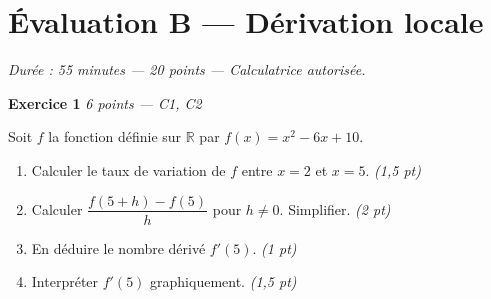 
\section*{Évaluation B — Dérivation locale}

\textit{Durée : 55 minutes — 20 points — Calculatrice autorisée.}

\bigskip

\textbf{Exercice 1} \hfill \textit{6 points — C1, C2}

Soit $f$ la fonction définie sur $\mathbb{R}$ par $f(x) = x^2 - 6x + 10$.

\begin{enumerate}
  \item Calculer le taux de variation de $f$ entre $x = 2$ et $x = 5$. \hfill \textit{(1,5 pt)}
  \item Calculer $\dfrac{f(5+h)-f(5)}{h}$ pour $h
\neq 0$. Simplifier. \hfill \textit{(2 pt)}
  \item En déduire le nombre dérivé $f'(5)$. \hfill \textit{(1 pt)}
  \item Interpréter $f'(5)$ graphiquement. \hfill \textit{(1,5 pt)}
\end{enumerate}


\bigskip

